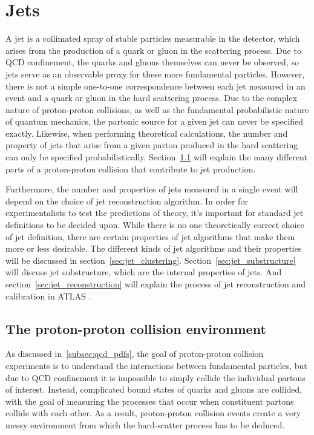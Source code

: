\chapter{Jets} \label{ch:jets}

A jet is a collimated spray of stable particles measurable in the detector,
which arises from the production of a quark or gluon in the scattering process.
Due to QCD confinement, the quarks and gluons themselves can never be observed,
so jets serve as an observable proxy for these more fundamental particles.
However, there is not a simple one-to-one correspondence between each jet measured in an event and a quark or gluon in the hard scattering process.
Due to the complex nature of proton-proton collisions, as well as the fundamental probabilistic nature of quantum mechanics, the partonic source for a given jet can never be specified exactly.
Likewise, when performing theoretical calculations, the number and property of jets that arise from a given parton produced in the hard scattering can only be specified probabilistically.
Section~\ref{sec:jet_collisions} will explain the many different parts of a proton-proton collision that contribute to jet production.

Furthermore, the number and properties of jets measured in a single event will depend on the choice of jet reconstruction algorithm.
In order for experimentalists to test the predictions of theory, it's important for standard jet definitions to be decided upon.
While there is no one theoretically correct choice of jet definition, there are certain properties of jet algorithms that make them more or less desirable.
The different kinds of jet algorithms and their properties will be discussed in section~\ref{sec:jet_clustering}.
Section~\ref{sec:jet_substructure} will discuss jet substructure, which are the internal properties of jets.
And section~\ref{sec:jet_reconstruction} will explain the process of jet reconstruction and calibration in ATLAS .

\section{The proton-proton collision environment}\label{sec:jet_collisions}

As discussed in~\ref{subsec:qcd_pdfs}, the goal of proton-proton collision experiments is to understand the interactions
between fundamental particles, but due to QCD confinement it is impossible to simply collide the individual partons of interest.
Instead, complicated bound states of quarks and gluons are collided,
with the goal of measuring the processes that occur when constituent partons collide with each other.
As a result, proton-proton collision events create a very messy environment from which the hard-scatter process
has to be deduced.


